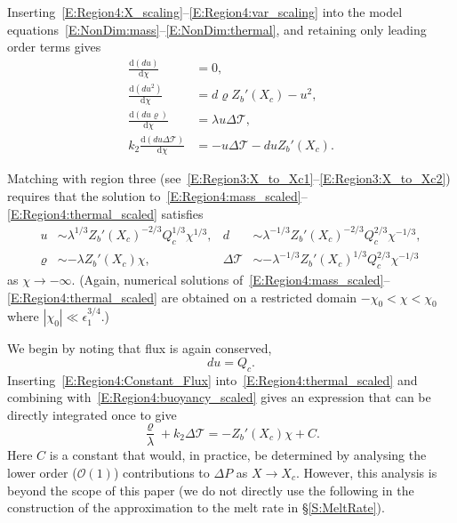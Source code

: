 \documentclass[openacc]{rsproca_new}%
\newcommand{\dd}[2]{\frac{\mathrm{d} #1}{\mathrm{d} #2}}
\newcommand{\order}[1]{\mathcal{O}(#1)}
\newcommand{\epsone}{\epsilon_{1}} %
\begin{document}
\newcommand{\p}{\varrho}
\renewcommand{\t}{\Delta \mathcal{T}}

Inserting~\eqref{E:Region4:X_scaling}--\eqref{E:Region4:var_scaling} into the model equations~\eqref{E:NonDim:mass}--\eqref{E:NonDim:thermal}, and retaining only leading order terms gives
\begin{align}
\dd{(du)}{\chi} &=0,\label{E:Region4:mass_scaled}\\
\dd{(du^2)}{\chi} &=  d \p Z_b'(X_c) -u^2,\label{E:Region4:mom_scaled}\\
\dd{(du\p)}{\chi} &=\lambda  u\t,\label{E:Region4:buoyancy_scaled}\\
k_2 \dd{(du \t)}{\chi} &=- u \t - du Z_b'(X_c).\label{E:Region4:thermal_scaled}
\end{align}

Matching with region three (see~\eqref{E:Region3:X_to_Xc1}--\eqref{E:Region3:X_to_Xc2}) requires that the solution to~\eqref{E:Region4:mass_scaled}--\eqref{E:Region4:thermal_scaled} satisfies
\begin{align}
u &\sim \lambda^{1/3}Z_b'(X_c)^{-2/3}Q_c^{1/3} \chi^{1/3}, &  d &\sim \lambda^{-1/3} Z_b'(X_c)^{-2/3} Q_c^{2/3}\chi^{-1/3}\label{E:Region4:far_field1},\\
\p &\sim - \lambda Z_b'(X_c) \chi, & \t &\sim -\lambda^{-1/3} Z_b'(X_c)^{1/3} Q_c^{2/3}\chi^{-1/3}\label{E:Region4:far_field2}
\end{align}
as $\chi \to -\infty$. (Again, numerical solutions of~\eqref{E:Region4:mass_scaled}--\eqref{E:Region4:thermal_scaled} are obtained on a restricted domain $-\chi_0 < \chi < \chi_0$ where $|\chi_0| \ll \epsone^{3/4}$.)

We begin by noting that flux is again conserved,
\begin{equation}\label{E:Region4:Constant_Flux}
du  = Q_c.
\end{equation}
Inserting~\eqref{E:Region4:Constant_Flux} into~\eqref{E:Region4:thermal_scaled} and combining with~\eqref{E:Region4:buoyancy_scaled} gives an expression that can be directly integrated once to give
\begin{equation}\label{E:Region4:Linear_p_t}
\frac{\p}{\lambda} + k_2 \t = -Z_b'(X_c)\chi + C.
\end{equation}
Here $C$ is a constant that would, in practice, be determined by analysing the lower order ($\order{1}$) contributions to $\Delta P$ as $X \to X_c$. However, this analysis is beyond the scope of this paper (we do not directly use the following in the construction of the approximation to the melt rate in \S\ref{S:MeltRate}).
\end{document}
